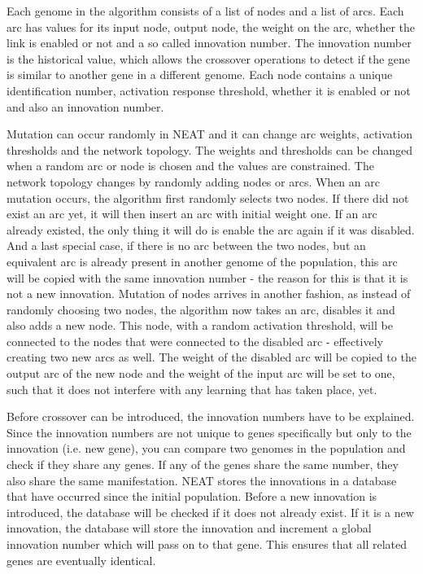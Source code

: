 Each genome in the algorithm consists of a list of nodes and a list of arcs.
Each arc has values for its input node, output node, the weight on the arc, whether the link is enabled or not and a so called innovation number.
The innovation number is the historical value, which allows the crossover operations to detect if the gene is similar to another gene in a different genome.
Each node contains a unique identification number, activation response threshold, whether it is enabled or not and also an innovation number.

Mutation can occur randomly in NEAT and it can change arc weights, activation thresholds and the network topology.
The weights and thresholds can be changed when a random arc or node is chosen and the values are constrained.
The network topology changes by randomly adding nodes or arcs.
When an arc mutation occurs, the algorithm first randomly selects two nodes.
If there did not exist an arc yet, it will then insert an arc with initial weight one.
If an arc already existed, the only thing it will do is enable the arc again if it was disabled.
And a last special case, if there is no arc between the two nodes, but an equivalent arc is already present in another genome of the population, this arc will be copied with the same innovation number - the reason for this is that it is not a new innovation.
Mutation of nodes arrives in another fashion, as instead of randomly choosing two nodes, the algorithm now takes an arc, disables it and also adds a new node.
This node, with a random activation threshold, will be connected to the nodes that were connected to the disabled arc - effectively creating two new arcs as well.
The weight of the disabled arc will be copied to the output arc of the new node and the weight of the input arc will be set to one, such that it does not interfere with any learning that has taken place, yet.

Before crossover can be introduced, the innovation numbers have to be explained.
Since the innovation numbers are not unique to genes specifically but only to the innovation (i.e. new gene), you can compare two genomes in the population and check if they share any genes.
If any of the genes share the same number, they also share the same manifestation. 
NEAT stores the innovations in a database that have occurred since the initial population.
Before a new innovation is introduced, the database will be checked if it does not already exist.
If it is a new innovation, the database will store the innovation and increment a global innovation number which will pass on to that gene.
This ensures that all related genes are eventually identical.

